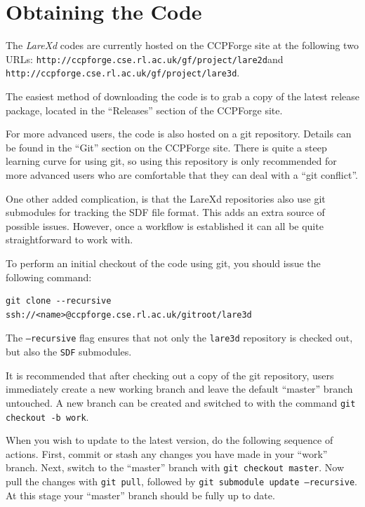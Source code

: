 \documentclass[11pt]{article}
\begin{document}
\section{Obtaining the Code}
The {\it LareXd} codes are currently hosted on the CCPForge site at
the following two URLs:\linebreak
{\tt http://ccpforge.cse.rl.ac.uk/gf/project/lare2d}\linebreak and
{\tt http://ccpforge.cse.rl.ac.uk/gf/project/lare3d}.

The easiest method of downloading the code is to grab a copy of the latest
release package, located in the ``Releases'' section of the CCPForge site.

For more advanced users, the code is also hosted on a git repository. Details
can be found in the ``Git'' section on the CCPForge site. There is quite a
steep learning curve for using git, so using this repository is only
recommended for more advanced users who are comfortable that they can deal with
a ``git conflict''.

One other added complication, is that the LareXd repositories also use git
submodules for tracking the SDF file format. This adds an extra source of
possible issues. However, once a workflow is established it can all be quite
straightforward to work with.

To perform an initial checkout of the code using git, you should issue the
following command:

\begin{verbatim}
git clone --recursive ssh://<name>@ccpforge.cse.rl.ac.uk/gitroot/lare3d
\end{verbatim}

The \texttt{--recursive} flag ensures that not only the \texttt{lare3d}
repository is checked out, but also the \texttt{SDF} submodules.

It is recommended that after checking out a copy of the git repository, users
immediately create a new working branch and leave the default ``master'' branch
untouched. A new branch can be created and switched to with the command
\texttt{git checkout -b work}.

When you wish to update to the latest version, do the following sequence of
actions. First, commit or stash any changes you have made in your ``work''
branch. Next, switch to the ``master'' branch with
\texttt{git checkout master}. Now pull the changes with \texttt{git pull},
followed by \texttt{git submodule update --recursive}.
At this stage your ``master'' branch should be fully up to date.
\end{document}
